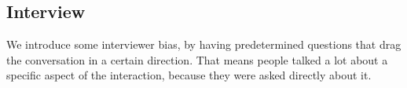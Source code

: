 \subsection{Interview}
We introduce some interviewer bias, by having predetermined questions that drag the conversation in a certain direction. That means people talked a lot about a specific aspect of the interaction, because they were asked directly about it. 